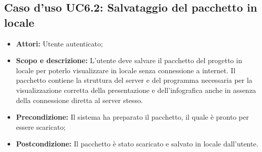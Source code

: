 \subsection{Caso d'uso UC6.2: Salvataggio del pacchetto in locale}
	\begin{itemize}
		\item \textbf{Attori:} Utente autenticato;
		\item \textbf{Scopo e descrizione:} L'utente deve salvare il pacchetto del progetto in locale per poterlo visualizzare in locale senza connessione a internet. Il pacchetto contiene la struttura del server e del programma necessaria per la visualizzazione corretta della presentazione e dell'infografica anche in assenza della connessione diretta al server stesso.
		\item \textbf{Precondizione:} Il sistema ha preparato il pacchetto, il quale è pronto per essere scaricato;
		\item \textbf{Postcondizione:} Il pacchetto è stato scaricato e salvato in locale dall'utente.
	\end{itemize}

